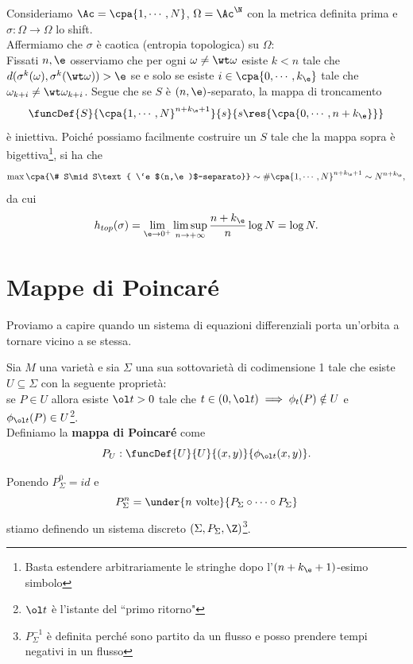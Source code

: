 \begin{example}
Consideriamo $\Ac=\cpa{1,\cdots, N}$, $\Omega=\Ac^\N$ con la metrica definita prima e $\sigma:\Omega\to\Omega$ lo shift.\\
Affermiamo che $\sigma$ \`e caotica (entropia topologica) su $\Omega$:\\
Fissati $n,\e$ osserviamo che per ogni $\omega\neq \wt\omega$ esiste $k<n$ tale che $d(\sigma^k(\omega),\sigma^k(\wt \omega))>\e$ se e solo se esiste $i\in\cpa{0,\cdots, k_\e}$ tale che $\omega_{k+i}\neq \wt \omega_{k+i}$. Segue che se $S$ \`e $(n,\e)$-separato, la mappa di troncamento
\[\funcDef{S}{\cpa{1,\cdots, N}^{n+k_\e+1}}{s}{s\res{\cpa{0,\cdots, n+k_\e}}}\] \`e iniettiva. Poich\'e possiamo facilmente costruire un $S$ tale che la mappa sopra \`e bigettiva\footnote{Basta estendere arbitrariamente le stringhe dopo l'$(n+k_\e+1)$-esimo simbolo}, si ha che
\[\max\cpa{\# S\mid S\text{ \`e $(n,\e)$-separato}}\sim \#\cpa{1,\cdots, N}^{n+k_\e+1}\sim N^{n+k_\e},\]
da cui
\[h_{top}(\sigma)=\lim_{\e\to0^+}\limsup_{n\to+\infty} \frac{n+k_\e}n\log N=\log N.\]
\end{example}

\section{Mappe di Poincar\'e}
Proviamo a capire quando un sistema di equazioni differenziali porta un'orbita a tornare vicino a se stessa.

\begin{definition}
Sia $M$ una variet\`a e sia $\Sigma$ una sua sottovariet\`a di codimensione 1 tale che esiste $U\subseteq \Sigma$ con la seguente propriet\`a:\\
se $P\in U$ allora esiste $\ol t>0$ tale che $t\in (0,\ol t)\implies \phi_t(P)\notin U$ e $\phi_{\ol t}(P)\in U$\footnote{$\ol t$ \`e l'istante del ``primo ritorno"}.\\
Definiamo la \textbf{mappa di Poincar\'e} come
\[P_U:\funcDef{U}{U}{(x,y)}{\phi_{\ol t}(x,y)}.\]
\end{definition}
\begin{remark}
Ponendo $P_\Sigma^0=id$ e
\[P_\Sigma^n=\under{n\text{ volte}}{P_\Sigma\circ\cdots\circ P_\Sigma}\]
stiamo definendo un sistema discreto $(\Sigma,P_\Sigma,\Z)$\footnote{$P_\Sigma^{-1}$ \`e definita perch\'e sono partito da un flusso e posso prendere tempi negativi in un flusso}.
\end{remark}


